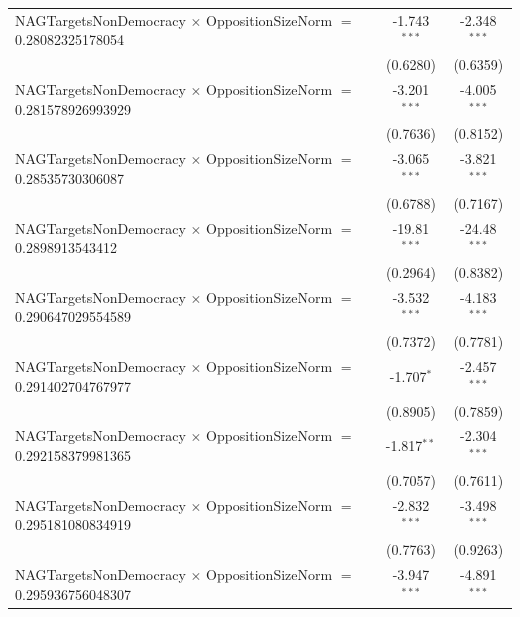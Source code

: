 \begin{tabular}{lcc}
   NAGTargetsNonDemocracy $\times$ OppositionSizeNorm $=$ 0.28082325178054      & -1.743$^{***}$       & -2.348$^{***}$\\   
                                                                                & (0.6280)             & (0.6359)\\   
   NAGTargetsNonDemocracy $\times$ OppositionSizeNorm $=$ 0.281578926993929     & -3.201$^{***}$       & -4.005$^{***}$\\   
                                                                                & (0.7636)             & (0.8152)\\   
   NAGTargetsNonDemocracy $\times$ OppositionSizeNorm $=$ 0.28535730306087      & -3.065$^{***}$       & -3.821$^{***}$\\   
                                                                                & (0.6788)             & (0.7167)\\   
   NAGTargetsNonDemocracy $\times$ OppositionSizeNorm $=$ 0.2898913543412       & -19.81$^{***}$       & -24.48$^{***}$\\   
                                                                                & (0.2964)             & (0.8382)\\   
   NAGTargetsNonDemocracy $\times$ OppositionSizeNorm $=$ 0.290647029554589     & -3.532$^{***}$       & -4.183$^{***}$\\   
                                                                                & (0.7372)             & (0.7781)\\   
   NAGTargetsNonDemocracy $\times$ OppositionSizeNorm $=$ 0.291402704767977     & -1.707$^{*}$         & -2.457$^{***}$\\   
                                                                                & (0.8905)             & (0.7859)\\   
   NAGTargetsNonDemocracy $\times$ OppositionSizeNorm $=$ 0.292158379981365     & -1.817$^{**}$        & -2.304$^{***}$\\   
                                                                                & (0.7057)             & (0.7611)\\   
   NAGTargetsNonDemocracy $\times$ OppositionSizeNorm $=$ 0.295181080834919     & -2.832$^{***}$       & -3.498$^{***}$\\   
                                                                                & (0.7763)             & (0.9263)\\   
   NAGTargetsNonDemocracy $\times$ OppositionSizeNorm $=$ 0.295936756048307     & -3.947$^{***}$       & -4.891$^{***}$\\   

\end{tabular}
